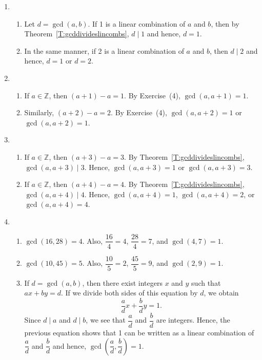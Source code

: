\begin{enumerate}
\item \begin{enumerate}
\item Let $d = \gcd \left( a, b \right)$. If 1 is a linear combination of $a$ and $b$, then by 
Theorem~\ref{T:gcddivideslincombs}, $d \mid 1$ and hence, $d = 1$.

\item In the same manner, if 2 is a linear combination of $a$ and $b$, then $d \mid 2$ and hence, 
$d = 1$ or $d = 2$.
\end{enumerate}

\item \begin{enumerate}
\item If $a \in \mathbb{Z}$, then $\left( a + 1 \right) - a = 1$.  By Exercise~(4), 
$\gcd \left( a, a + 1 \right) = 1$.

\item Similarly, $\left( a + 2 \right) - a = 2$.  By Exercise~(4), 
$\gcd \left( a, a + 2 \right) = 1$ or $\gcd \left( a, a + 2 \right) = 1$.
\end{enumerate}

\item \begin{enumerate}
\item If $a \in \mathbb{Z}$, then $\left( a + 3 \right) - a = 3$.  By Theorem~\ref{T:gcddivideslincombs}, 
$\gcd \left( a, a + 3 \right) \mid 3$.  Hence, $\gcd \left( a, a + 3 \right) = 1$ or 
$\gcd \left( a, a + 3 \right) = 3$.

\item If $a \in \mathbb{Z}$, then $\left( a + 4 \right) - a = 4$.  By Theorem~\ref{T:gcddivideslincombs}, 
$\gcd \left( a, a + 4 \right) \mid 4$.  Hence, $\gcd \left( a, a + 4 \right) = 1$,  
$\gcd \left( a, a + 4 \right) = 2$, or $\gcd \left( a, a + 4 \right) = 4$.
\end{enumerate}

\item \begin{enumerate}
\item $\gcd \left( 16, 28 \right) = 4$.  Also, $\dfrac{16}{4} = 4$, $\dfrac{28}{4} = 7$, and 
$\gcd \left( 4, 7 \right) = 1$.

\item $\gcd \left( 10, 45 \right) = 5$.  Also, $\dfrac{10}{5} = 2$, $\dfrac{45}{5} = 9$, and 
$\gcd \left( 2, 9 \right) = 1$.

\item If $d = \gcd \left( a, b \right)$, then there exist integers $x$ and $y$ such that 
$ax + by = d$.  If we divide both sides of this equation by $d$, we obtain
\[
\frac{a}{d} x + \frac{b}{d} y = 1.
\]
Since $d \mid a$ and $d \mid b$, we see that $\dfrac{a}{d}$ and $\dfrac{b}{d}$ are integers.  Hence, the previous equation shows that 1 can be written as a linear combination of 
$\dfrac{a}{d}$ and $\dfrac{b}{d}$ and hence, 
$\gcd \left( \dfrac{a}{d}, \dfrac{b}{d} \right) = 1$.
\end{enumerate}


\end{enumerate}
